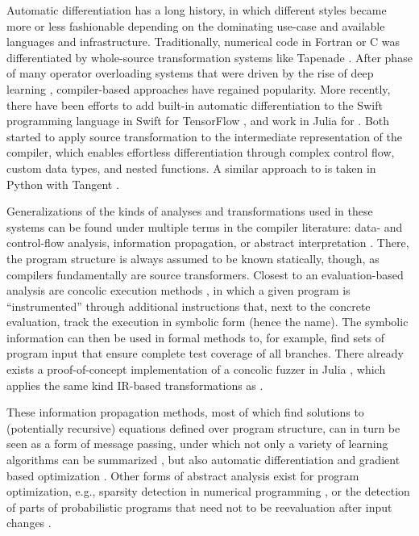 Automatic differentiation has a long history, in which different styles became more or less
fashionable depending on the dominating use-case and available languages and infrastructure.
Traditionally, numerical code in Fortran or C was differentiated by whole-source transformation
systems like Tapenade \parencite{tapenadedevelopers2019tapenade}.  After phase of many operator
overloading systems that were driven by the rise of deep learning
\parencite{abadi2015tensorflow,paszke2017automatic,neubig2017dynet,tokui2015chainer}, compiler-based
approaches have regained popularity.  More recently, there have been efforts to add built-in
automatic differentiation to the Swift programming language in Swift for TensorFlow
\parencite{tensorflowdevelopers2018swift}, and work in Julia for 
\parencite{innes2018don}.  Both started to apply source transformation to the intermediate
representation of the compiler, which enables effortless differentiation through complex control
flow, custom data types, and nested functions.  A similar approach to  is
taken in Python with Tangent \parencite{vanmerrienboer2018tangent}.

Generalizations of the kinds of analyses and transformations used in these systems can be found
under multiple terms in the compiler literature: data- and control-flow analysis, information
propagation, or abstract interpretation \parencite{muchnick1997advanced,singer2018static}.  There,
the program structure is always assumed to be known statically, though, as compilers fundamentally
are source transformers.  Closest to an evaluation-based analysis are concolic execution methods
\parencite{sen2005cute,zeller2019concolic}, in which a given program is \enquote{instrumented}
through additional instructions that, next to the concrete evaluation, track the execution in
symbolic form (hence the name).  The symbolic information can then be used in formal methods to, for
example, find sets of program input that ensure complete test coverage of all branches.  There
already exists a proof-of-concept implementation of a concolic fuzzer in Julia
\parencite{churavy2019vchuravy}, which applies the same kind IR-based transformations as
.

These information propagation methods, most of which find solutions to (potentially recursive)
equations defined over program structure, can in turn be seen as a form of message passing, under
which not only a variety of learning algorithms can be summarized \parencite{minka2005divergence},
but also automatic differentiation \parencite{minka2019automatic} and gradient based optimization
\parencite{dauwels2005steepest}.  Other forms of abstract analysis exist for program optimization,
e.g., sparsity detection in numerical programming \parencite{gowda2019sparsity}, or the detection of
parts of probabilistic programs that need not to be reevaluation after input changes
\parencite{becker2020dynamic}.

